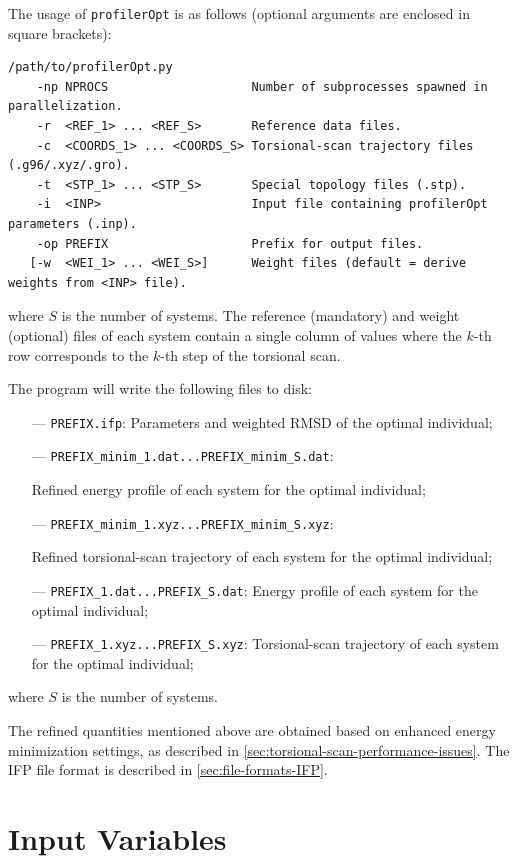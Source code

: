 \documentclass[10pt,a4paper,openany]{memoir}
\numberwithin{equation}{section}
\newcommand{\profileropt}[0]{\texttt{profilerOpt}}
\begin{document}
The usage of \profileropt{} is as follows (optional arguments are
enclosed in square brackets):

\begin{lstlisting}
/path/to/profilerOpt.py
    -np NPROCS                    Number of subprocesses spawned in parallelization.
    -r  <REF_1> ... <REF_S>       Reference data files.
    -c  <COORDS_1> ... <COORDS_S> Torsional-scan trajectory files (.g96/.xyz/.gro).
    -t  <STP_1> ... <STP_S>       Special topology files (.stp).
    -i  <INP>                     Input file containing profilerOpt parameters (.inp).
    -op PREFIX                    Prefix for output files.
   [-w  <WEI_1> ... <WEI_S>]      Weight files (default = derive weights from <INP> file).
\end{lstlisting}\vspace{1ex}

\noindent where $S$ is the number of systems.
The reference (mandatory) and weight (optional) files of each system contain a single column
of values where the $k$-th row corresponds to the $k$-th step of the
torsional scan.

The program will write the following files to disk:
\begin{itemize}
\item [---]\texttt{PREFIX.ifp}: Parameters and weighted RMSD of the optimal individual;
\item[---] \texttt{PREFIX\_minim\_1.dat...PREFIX\_minim\_S.dat}: \par Refined energy profile of each system for the optimal individual;
\item[---] \texttt{PREFIX\_minim\_1.xyz...PREFIX\_minim\_S.xyz}: \par Refined torsional-scan trajectory of each system for the optimal individual;
\item[---] \texttt{PREFIX\_1.dat...PREFIX\_S.dat}: Energy profile of each system for the optimal individual;
\item[---] \texttt{PREFIX\_1.xyz...PREFIX\_S.xyz}: Torsional-scan trajectory of each system for the optimal individual;
\end{itemize}
where $S$ is the number of systems.

The refined quantities mentioned above are obtained based on enhanced
energy minimization settings, as described in \autoref{sec:torsional-scan-performance-issues}.
The IFP file format is described in
\autoref{sec:file-formats-IFP}.


\section{Input Variables}
\label{sec:file-formats-input-variables}
\end{document}
